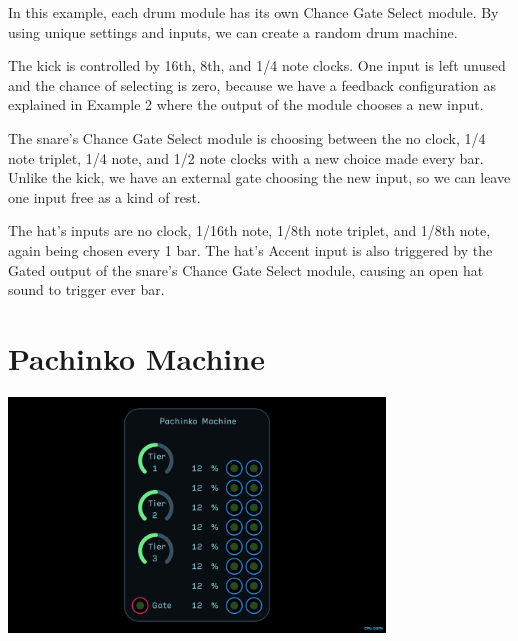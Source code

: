 \documentclass[11pt]{book}
\begin{document}
\begin{multicols*}{2}
In this example, each drum module has its own Chance Gate Select module. By using unique settings and inputs, we can create a random drum machine.

The kick is controlled by 16th, 8th, and 1/4 note clocks. One input is left unused and the chance of selecting is zero, because we have a feedback configuration as explained in Example 2 where the output of the module chooses a new input.

The snare's Chance Gate Select module is choosing between the no clock, 1/4 note triplet, 1/4 note, and 1/2 note clocks with a new choice made every bar. Unlike the kick, we have an external gate choosing the new input, so we can leave one input free as a kind of rest.

The hat's inputs are no clock, 1/16th note, 1/8th note triplet, and 1/8th note, again being chosen every 1 bar. The hat's Accent input is also triggered by the Gated output of the snare's Chance Gate Select module, causing an open hat sound to trigger ever bar.

\end{multicols*}

\pagebreak


\section{Pachinko Machine}

\begin{center}
\includegraphics[width=0.75\textwidth]{pachinko-machine.png}
\end{center}
\end{document}
